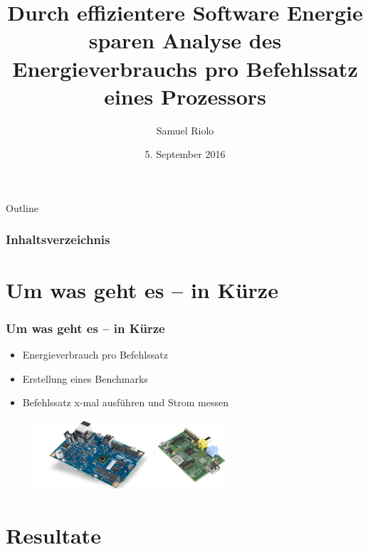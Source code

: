\documentclass{beamer}
\title[Durch effizientere Software Energie sparen]{Durch effizientere Software Energie sparen \newline \newline Analyse des Energieverbrauchs pro Befehlssatz eines Prozessors}
\author{Samuel Riolo}
\institute{Bachelor Thesis \textendash FFHS}
\date{5. September 2016}
\begin{document}




\begin{frame}
  \titlepage
\end{frame}

\begin{frame}{Outline}
\frametitle{Inhaltsverzeichnis}
    \tableofcontents[]
\end{frame}



\section{Um was geht es -- in K{\"u}rze} 
\begin{frame}
\frametitle{Um was geht es -- in K{\"u}rze} 
\begin{itemize}
\item Energieverbrauch pro Befehlssatz
\item Erstellung eines Benchmarks
\item Befehlssatz x-mal ausführen und Strom messen
\end{itemize}


\begin{figure}[!htb]\centering
   \begin{minipage}{0.49\textwidth}
    \includegraphics[height=100px]{iot_galileo.png}
   \end{minipage}
   \begin {minipage}{0.49\textwidth}
     \includegraphics[height=100px]{raspberry-pi-2.png}
   \end{minipage}
\end{figure}
\end{frame}


\section{Resultate} 
\end{document}
